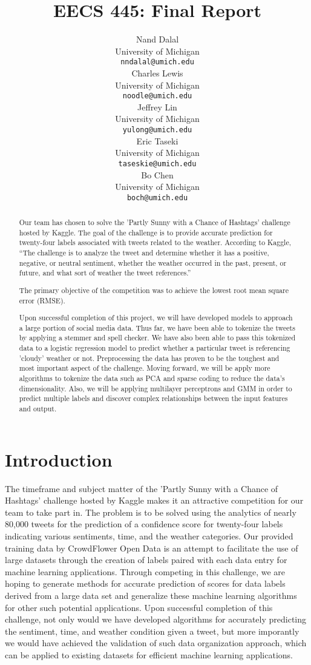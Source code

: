 \documentclass{article}
\title{EECS 445: Final Report}
\author{
Nand Dalal \\
University of Michigan \\
\texttt{nndalal@umich.edu} \\
\And
Charles Lewis \\
University of Michigan \\
\texttt{noodle@umich.edu} \\
\AND
Jeffrey Lin \\
University of Michigan \\
\texttt{yulong@umich.edu} \\
\And
Eric Taseki \\
University of Michigan \\
\texttt{taseskie@umich.edu} \\
\And
Bo Chen \\
University of Michigan \\
\texttt{boch@umich.edu} \\
}
\begin{document}
\maketitle

\begin{abstract}
Our team has chosen to solve the 'Partly Sunny with a Chance of Hashtags' challenge hosted by Kaggle. The goal of the challenge is to provide accurate prediction for twenty-four labels associated with tweets related to the weather. According to Kaggle, ``The challenge is to analyze the tweet and determine whether it has a positive, negative, or neutral sentiment, whether the weather occurred in the past, present, or future, and what sort of weather the tweet references.''

The primary objective of the competition was to achieve the lowest root mean square error (RMSE).

Upon successful completion of this project, we will have developed models to approach a large portion of social media data. Thus far, we have been able to tokenize the tweets by applying a stemmer and spell checker. We have also been able to pass this tokenized data to a logistic regression model to predict whether a particular tweet is referencing 'cloudy' weather or not. Preprocessing the data has proven to be the toughest and most important aspect of the challenge. Moving forward, we will be apply more algorithms to tokenize the data such as PCA and sparse coding to reduce the data's dimensionality. Also, we will be applying multilayer perceptrons and GMM in order to predict multiple labels and discover complex relationships between the input features and output.
\end{abstract}

\newpage

\section{Introduction}
The timeframe and subject matter of the 'Partly Sunny with a Chance of Hashtags' challenge hosted by Kaggle makes it an attractive competition for our team to take part in. The problem is to be solved using the analytics of nearly 80,000 tweets for the prediction of a confidence score for twenty-four labels indicating various sentiments, time, and the weather categories. Our provided training data by CrowdFlower Open Data is an attempt to facilitate the use of large datasets through the creation of labels paired with each data entry for machine learning applications. Through competing in this challenge, we are hoping to generate methods for accurate prediction of scores for data labels derived from a large data set and generalize these machine learning algorithms for other such potential applications. Upon successful completion of this challenge, not only would we have developed algorithms for accurately predicting the sentiment, time, and weather condition given a tweet, but more imporantly we would have achieved the validation of such data organization approach, which can be applied to existing datasets for efficient machine learning applications.
\end{document}
